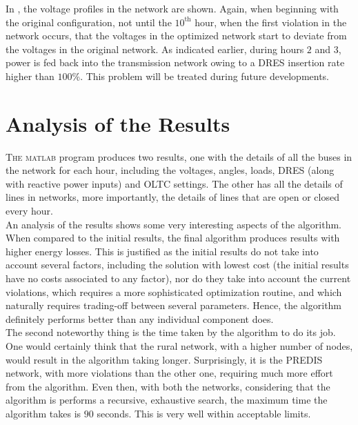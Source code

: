 In , the voltage profiles in the network are shown. Again, when beginning with the original configuration, not until the $10^{\mathrm{th}}$ hour, when the first violation in the network occurs, that the voltages in the optimized network start to deviate from the voltages in the original network. As indicated earlier, during hours $2$ and $3$, power is fed back into the transmission network owing to a DRES insertion rate higher than $100$\%. This problem will be treated during future developments.

\section{Analysis of the Results}

\lettrine[nindent=0pt]{T}{he} \textsc{matlab} program produces two results, one with the details of all the buses in the network for each hour, including the voltages, angles, loads, DRES (along with reactive power inputs) and OLTC settings. The other has all the details of lines in networks, more importantly, the details of lines that are open or closed every hour.\\

An analysis of the results shows some very interesting aspects of the algorithm. When compared to the initial results, the final algorithm produces results with higher energy losses. This is justified as the initial results do not take into account several factors, including the solution with lowest cost (the initial results have no costs associated to any factor), nor do they take into account the current violations, which requires a more sophisticated optimization routine, and which naturally requires trading-off between several parameters. Hence, the algorithm definitely performs better than any individual component does.\\

The second noteworthy thing is the time taken by the algorithm to do its job. One would certainly think that the rural network, with a higher number of nodes, would result in the algorithm taking longer. Surprisingly, it is the PREDIS network, with more violations than the other one, requiring much more effort from the algorithm. Even then, with both the networks, considering that the algorithm is performs a recursive, exhaustive search, the maximum time the algorithm takes is $90$ seconds. This is very well within acceptable limits.
